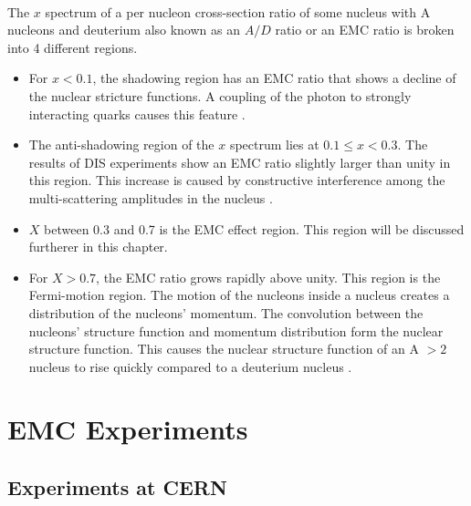 \paragraph{}The $x$ spectrum of a per nucleon cross-section ratio of some nucleus with A nucleons and deuterium also known as an $A/D$ ratio or an EMC ratio is broken into 4 different regions. 
\begin{itemize}
	\item For $x < 0.1$, the shadowing region has an EMC ratio that shows a decline of the nuclear stricture functions. A coupling of the photon to strongly interacting quarks causes this feature \cite{PnN}.
	\item The anti-shadowing region of the $x$ spectrum lies at $0.1 \leq x < 0.3 $. The results of DIS experiments show an EMC ratio slightly larger than unity in this region. This increase is caused by constructive interference among the multi-scattering amplitudes in the nucleus \cite{shadowing}.
	\item $X$ between 0.3 and 0.7 is the EMC effect region. This region will be discussed furtherer in this chapter.
	\item For $X > 0.7$, the EMC ratio grows rapidly above unity.  This region is the Fermi-motion region. The  motion of the nucleons inside a nucleus creates a distribution of the nucleons'  momentum. The convolution between the nucleons' structure function and momentum distribution form the nuclear structure function. This causes the nuclear structure function of an A $> 2$ nucleus to rise quickly compared to a deuterium nucleus \cite{Ajth,PnN}. 
\end{itemize}
\section{EMC Experiments}
\subsection{Experiments at CERN}
